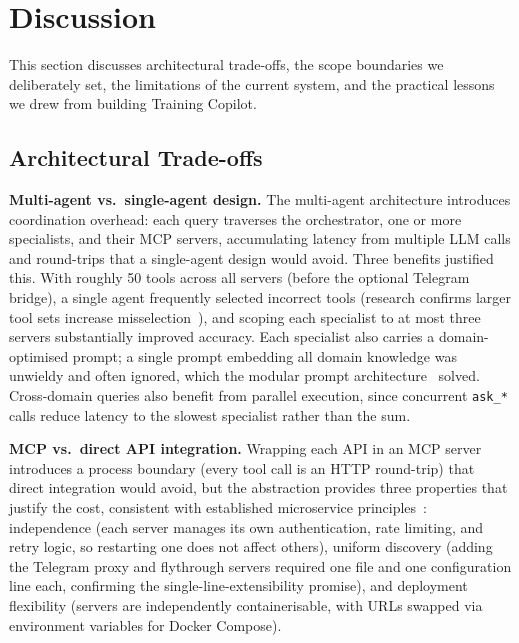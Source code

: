 \section{Discussion}\label{sec:discussion}

This section discusses architectural trade-offs, the scope boundaries we deliberately set, the limitations of the current system, and the practical lessons we drew from building Training Copilot.

\subsection{Architectural Trade-offs}\label{sec:discussion:tradeoffs}

\textbf{Multi-agent vs.\ single-agent design.} The multi-agent architecture introduces coordination overhead: each query traverses the orchestrator, one or more specialists, and their MCP servers, accumulating latency from multiple LLM calls and round-trips that a single-agent design would avoid. Three benefits justified this. With roughly 50 tools across all servers (before the optional Telegram bridge), a single agent frequently selected incorrect tools (research confirms larger tool sets increase misselection~\citep{qu_tool_2024, patil_gorilla_2023}), and scoping each specialist to at most three servers substantially improved accuracy. Each specialist also carries a domain-optimised prompt; a single prompt embedding all domain knowledge was unwieldy and often ignored, which the modular prompt architecture~\citep{wang_survey_2024} solved. Cross-domain queries also benefit from parallel execution, since concurrent \texttt{ask\_*} calls reduce latency to the slowest specialist rather than the sum.

\textbf{MCP vs.\ direct API integration.} Wrapping each API in an MCP server introduces a process boundary (every tool call is an HTTP round-trip) that direct integration would avoid, but the abstraction provides three properties that justify the cost, consistent with established microservice principles~\citep{dragoni_microservices_2017}: independence (each server manages its own authentication, rate limiting, and retry logic, so restarting one does not affect others), uniform discovery (adding the Telegram proxy and flythrough servers required one file and one configuration line each, confirming the single-line-extensibility promise), and deployment flexibility (servers are independently containerisable, with URLs swapped via environment variables for Docker Compose).

